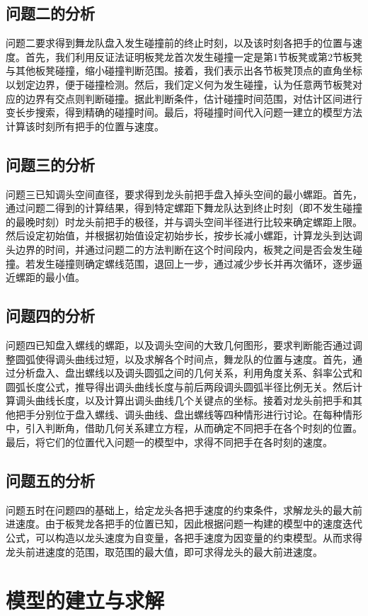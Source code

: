 \documentclass{cumcmthesis}
\begin{document}
\subsection{问题二的分析}
问题二要求得到舞龙队盘入发生碰撞前的终止时刻，以及该时刻各把手的位置与速度。首先，我们利用反证法证明板凳龙首次发生碰撞一定是第1节板凳或第2节板凳与其他板凳碰撞，缩小碰撞判断范围。接着，我们表示出各节板凳顶点的直角坐标以划定边界，便于碰撞检测。然后，我们定义何为发生碰撞，认为任意两节板凳对应的边界有交点则判断碰撞。据此判断条件，估计碰撞时间范围，对估计区间进行变长步搜索，得到精确的碰撞时间。最后，将碰撞时间代入问题一建立的模型方法计算该时刻所有把手的位置与速度。
\subsection{问题三的分析}
问题三已知调头空间直径，要求得到龙头前把手盘入掉头空间的最小螺距。首先，通过问题二得到的计算结果，得到特定螺距下舞龙队达到终止时刻（即不发生碰撞的最晚时刻）时龙头前把手的极径，并与调头空间半径进行比较来确定螺距上限。然后设定初始值，并根据初始值设定初始步长，按步长减小螺距，计算龙头到达调头边界的时间，并通过问题二的方法判断在这个时间段内，板凳之间是否会发生碰撞。若发生碰撞则确定螺线范围，退回上一步，通过减少步长并再次循环，逐步逼近螺距的最小值。
\subsection{问题四的分析}
问题四已知盘入螺线的螺距，以及调头空间的大致几何图形，要求判断能否通过调整圆弧使得调头曲线过短，以及求解各个时间点，舞龙队的位置与速度。首先，通过分析盘入、盘出螺线以及调头圆弧之间的几何关系，利用角度关系、斜率公式和圆弧长度公式，推导得出调头曲线长度与前后两段调头圆弧半径比例无关。然后计算调头曲线长度，以及计算出调头曲线几个关键点的坐标。接着对龙头前把手和其他把手分别位于盘入螺线、调头曲线、盘出螺线等四种情形进行讨论。在每种情形中，引入判断角，借助几何关系建立方程，从而确定不同把手在各个时刻的位置。最后，将它们的位置代入问题一的模型中，求得不同把手在各时刻的速度。
\subsection{问题五的分析}
问题五时在问题四的基础上，给定龙头各把手速度的约束条件，求解龙头的最大前进速度。由于板凳龙各把手的位置已知，因此根据问题一构建的模型中的速度迭代公式，可以构造以龙头速度为自变量，各把手速度为因变量的约束模型。从而求得龙头前进速度的范围，取范围的最大值，即可求得龙头的最大前进速度。
\section{模型的建立与求解}
\end{document}
